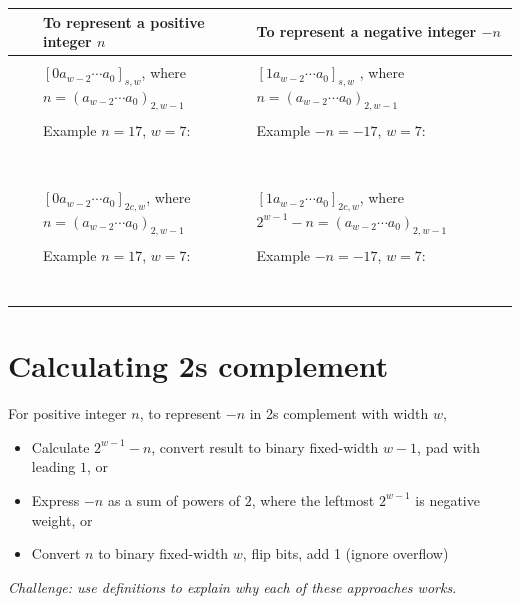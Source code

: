 \documentclass[12pt, oneside]{article}
\begin{document}
\begin{tabular}{|cc|p{3.4in}|p{3.7in}|}
\hline
& & To  represent a positive integer $n$ & To represent a negative integer $-n$\\
\hline
&& &  \\
&\parbox[t]{2mm}{} &
$[ 0a_{w-2} \cdots a_0]_{s,w}$, where $n =  (a_{w-2} \cdots a_0)_{2,w-1}$& 
$[1a_{w-2} \cdots a_0]_{s,w}$
, where $n =  (a_{w-2} \cdots a_0)_{2,w-1}$\\
&& & \\
&& Example $n=17$, $w=7$:  & Example $-n=-17$, $w=7$: \\
&& & \\
&& & \\
&& & \\
&& & \\
&& & \\
&& & \\
&& & \\
\hline
&&  &  \\
&\parbox[t]{2mm}{} &
$[0a_{w-2} \cdots a_0]_{2c,w}$, where $n =  (a_{w-2} \cdots a_0)_{2,w-1}$& $[1a_{w-2} \cdots a_0]_{2c,w}$, where $2^{w-1} - n =  (a_{w-2} \cdots a_0)_{2,w-1}$\\
&& & \\
&& Example $n=17$, $w=7$:  & Example $-n=-17$, $w=7$: \\
&& & \\
&& & \\
&& & \\
&& & \\
&& & \\
&& & \\
&& & \\
\hline
\end{tabular} \vfill
\section*{Calculating 2s complement}


For positive integer $n$, to represent $-n$ in 
2s complement with width $w$,
\begin{itemize}
    \item Calculate $2^{w-1} - n$, convert 
    result to binary fixed-width $w-1$, pad 
    with leading $1$, or
    \item Express $-n$ as a sum of powers of $2$, 
    where the leftmost $2^{w-1}$ is negative weight, or
    \item Convert $n$ to binary fixed-width $w$, 
    flip bits, add 1 (ignore overflow)
\end{itemize}

{\it Challenge: use definitions to explain why
each of these approaches works.} \vfill
\end{document}
